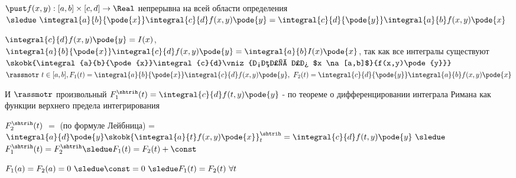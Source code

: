 \begin{proofs}

	$\pust f(x,y): [a,b]\times [c,d] \to \Real$ непрерывна на всей области определения  $\sledue \ \integral{a}{b}{\pode{x}}\integral{c}{d}f(x,y)\pode{y} = \integral{c}{d}{\pode{y}}\integral{a}{b}f(x,y)\pode{x}$
	\begin{dokvo}
		$\integral{c}{d}f(x,y)\pode{y} = I(x)$, $\integral{a}{b}{\pode{x}}\integral{c}{d}f(x,y)\pode{y} = \integral{a}{b}I(x)\pode{x}$,
		так как все интегралы существуют $\skobk{\integral{a}{b}{\pode{x}}\integral{c}{d}\vniz{непр по $x \na [a,b]$}{f(x,y)\pode{y}}}$
		$\rassmotr \ t \in [a,b], F_1(t) = \integral{a}{b}{\pode{x}}\integral{c}{d}f(x,y)\pode{y}, \ F_2(t) = \integral{c}{d}{\pode{y}}\integral{a}{b}f(x,y)\pode{x}$

		И $\rassmotr$ произвольный $F^{\shtrih}_1(t)= \integral{c}{d}f(t,y)\pode{y}$ - по теореме о дифференцировании интеграла Римана как функции верхнего предела интегрирования

		$F^{\shtrih}_2(t)$ $=$ (по формуле Лейбница) = $\integral{a}{d}\pode{y}\skobk{\integral{a}{t}f(x,y)\pode{x}}^{\shtrih}_{t} = \integral{c}{d}f(t,y)\pode{y} \ \sledue$ $F^{\shtrih}_1(t) = F^{\shtrih}_2 \sledue F_1(t) = F_2(t) + \const$

		$F_1(a) = F_2(a) = 0 \ \sledue \const = 0 \ \sledue F_1(t) = F_2(t) \ \forall t$
	\end{dokvo}
\end{proofs}
